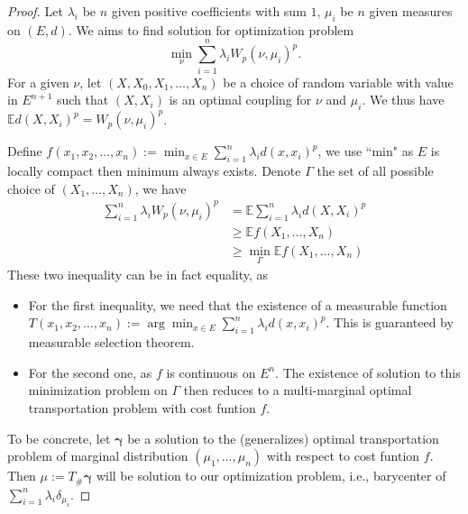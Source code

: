 \begin{proof}
	Let $\lambda_i$ be $n$ given positive coefficients with sum $1$, $\mu_i$ be $n$ given measures on $(E,d)$. We aims to find solution for optimization problem
	\[
		\min_{\nu} \sum_{i=1}^{n}\lambda_i W_p(\nu, \mu_i)^p.
	\]
	For a given $\nu$, let $(X, X_0, X_1,\ldots,X_n)$ be a choice of random variable with value in $E^{n+1}$ such that $(X,X_i)$ is an optimal coupling for $\nu$ and $\mu_i$. We thus have $\mathbb{E}d(X,X_i)^p = W_p(\nu, \mu_i)^p$.

	Define $f(x_1, x_2, \ldots, x_n):=\min_{x \in E} \sum_{i=1}^{n} \lambda_i d(x, x_i)^p$, we use ``min" as $E$ is locally compact then minimum always exists. Denote $\Gamma$ the set of all possible choice of $(X_1, \ldots, X_n)$, we have
	\begin{align*}
		\sum_{i=1}^{n}\lambda_i W_p(\nu, \mu_i)^p &= \mathbb{E} \sum_{i=1}^{n}\lambda_i d(X,X_i)^p \\
																						&\geq \mathbb{E} f(X_1, \ldots, X_n)\\
																						&\geq \min_{\Gamma}\mathbb{E} f(X_1, \ldots, X_n)
	\end{align*}
	These two inequality can be in fact equality, as
	\begin{itemize}
		\item For the first inequality, we need that the existence of a measurable function $T(x_1, x_2, \ldots, x_n):= \arg \min_{x \in E} \sum_{i=1}^{n} \lambda_i d(x, x_i)^p$. This is guaranteed by measurable selection theorem.
		\item For the second one, as $f$ is continuous on $E^n$. The existence of solution to this minimization problem on $\Gamma$ then reduces to a multi-marginal optimal transportation problem with cost funtion $f$.
	\end{itemize}
To be concrete, let $\boldsymbol \gamma$ be a solution to the (generalizes) optimal transportation problem of marginal distribution $(\mu_1, \ldots, \mu_n)$ with respect to cost funtion $f$. Then $\mu:= T_{\#}\boldsymbol \gamma$ will be solution to our optimization problem, i.e., barycenter of $\sum_{i=1}^{n}\lambda_i \delta_{\mu_i}$.

\end{proof}

